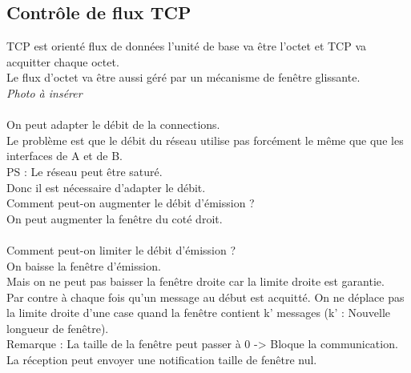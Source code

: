 \documentclass{article}
\begin{document}
\subsection{Contrôle de flux TCP}
TCP est orienté flux de données l'unité de base va être l'octet et TCP va acquitter chaque octet. \\ 
Le flux d'octet va être aussi géré par un mécanisme de fenêtre  glissante.
\\ \emph{Photo à insérer} \\
\\
On peut adapter le débit de la connections. \\
Le problème est que le débit du réseau utilise pas forcément le même que que les interfaces de A et de B. \\
PS : Le réseau peut être saturé. \\
Donc il est nécessaire d'adapter le débit. \\
\newpage
Comment peut-on augmenter le débit d'émission ? \\
On peut augmenter la fenêtre du coté droit. \\
\\
Comment peut-on limiter le débit d'émission ? \\
On baisse la fenêtre d'émission.\\
Mais on ne peut pas baisser la fenêtre droite car la limite droite est garantie. \\
Par contre à chaque fois qu'un message au début est acquitté. On ne déplace pas la limite droite d'une case quand la fenêtre contient k' messages (k' : Nouvelle longueur de fenêtre). \\
Remarque : La taille de la fenêtre peut passer à 0 -> Bloque la communication. \\
La réception peut envoyer une notification taille de fenêtre nul. \\
\end{document}
